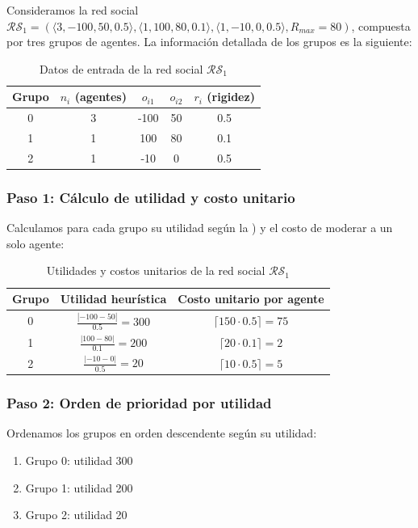 \documentclass[11pt,letter]{article}
\begin{document}
Consideramos la red social $\mathcal{RS}_1 = ( \langle 3, -100, 50, 0.5 \rangle, \langle 1, 100, 80, 0.1 \rangle, \langle 1, -10, 0, 0.5 \rangle, R_{max} = 80 )$, compuesta por tres grupos de agentes. La información detallada de los grupos es la siguiente:

\begin{table}[H]
\centering
\begin{tabular}{c|c|c|c|c}
\textbf{Grupo} & $n_i$ (agentes) & $o_{i1}$ & $o_{i2}$ & $r_i $ (rigidez) \\
\hline
0 & 3 & -100 & 50 & 0.5 \\
1 & 1 & 100 & 80 & 0.1 \\
2 & 1 & -10 & 0 & 0.5 \\
\end{tabular}
\caption{Datos de entrada de la red social $\mathcal{RS}_1$}
\end{table}

\subsubsection*{Paso 1: Cálculo de utilidad y costo unitario}

Calculamos para cada grupo su utilidad según la ) y el costo de moderar a un solo agente:

\begin{table}[H]
\centering
\begin{tabular}{c|c|c}
\textbf{Grupo} & Utilidad heurística & Costo unitario por agente \\
\hline
0 & $\frac{|-100 - 50|}{0.5} = 300$ & $\lceil 150 \cdot 0.5 \rceil = 75$ \\
1 & $\frac{|100 - 80|}{0.1} = 200$ & $\lceil 20 \cdot 0.1 \rceil = 2$ \\
2 & $\frac{|-10 - 0|}{0.5} = 20$ & $\lceil 10 \cdot 0.5 \rceil = 5$ \\
\end{tabular}
\caption{Utilidades y costos unitarios de la red social $\mathcal{RS}_1$}
\end{table}

\subsubsection*{Paso 2: Orden de prioridad por utilidad}

Ordenamos los grupos en orden descendente según su utilidad:

\begin{enumerate}
    \item Grupo 0: utilidad 300
    \item Grupo 1: utilidad 200
    \item Grupo 2: utilidad 20
\end{enumerate}
\end{document}

